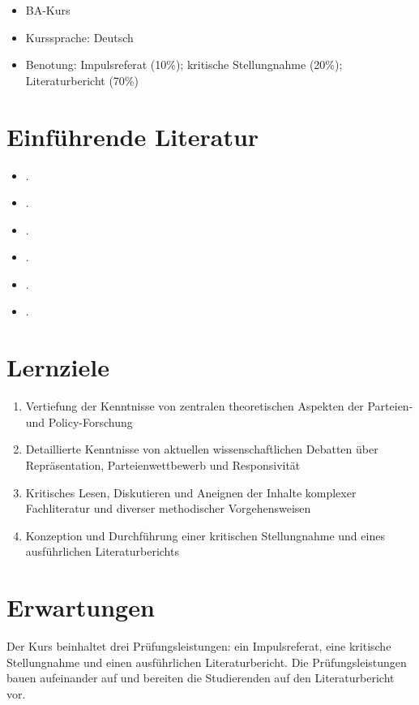 \documentclass[abstract=on,parskip=full,headings=standardclasses,fontsize=11pt,paper=a4]{scrartcl}
\begin{document}
\begin{itemize}
\item BA-Kurs
\item  Kurssprache: Deutsch
\item Benotung: Impulsreferat (10\%); kritische Stellungnahme (20\%); Literaturbericht (70\%)
\end{itemize}



\section*{Einführende Literatur}

\begin{itemize}
\item {}.
\item {}.
\item {}.
\item {}.
\item {}.
\item {}.
\end{itemize}

\section*{Lernziele}

\begin{enumerate}
\item Vertiefung der Kenntnisse von zentralen theoretischen Aspekten der Parteien- und Policy-Forschung
\item Detaillierte Kenntnisse von aktuellen wissenschaftlichen Debatten über Repräsentation, Parteienwettbewerb und Responsivität
\item  Kritisches Lesen, Diskutieren und Aneignen der Inhalte komplexer Fachliteratur und diverser methodischer Vorgehensweisen
\item Konzeption und Durchführung einer kritischen Stellungnahme und eines ausführlichen Literaturberichts
\end{enumerate}

\section*{Erwartungen}

Der Kurs beinhaltet drei Prüfungsleistungen: ein Impulsreferat, eine kritische Stellungnahme und einen ausführlichen Literaturbericht. Die  Prüfungsleistungen bauen aufeinander auf und bereiten die Studierenden auf den Literaturbericht vor. 
\end{document}
